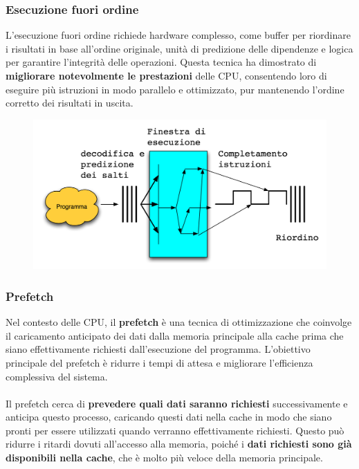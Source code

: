 \begin{frame}
	\frametitle{ Esecuzione fuori ordine}

		L'esecuzione fuori ordine richiede hardware complesso, come buffer per riordinare i risultati in base all'ordine originale, unità di predizione delle dipendenze e logica per garantire l'integrità delle operazioni. Questa tecnica ha dimostrato di \textbf{migliorare notevolmente le prestazioni} delle CPU, consentendo loro di eseguire più istruzioni in modo parallelo e ottimizzato, pur mantenendo l'ordine corretto dei risultati in uscita.%
		
		
		\begin{figure}[!htbp]
			\centering 
			\includegraphics[width=0.7\linewidth]{images/7_pipeline/superscalar_processor.png}
			\label{fig:pipeline_superscalar_processor}
		\end{figure}

\end{frame}


\begin{frame}
	\frametitle{ Prefetch}

		Nel contesto delle CPU, il \textbf{prefetch} è una tecnica di ottimizzazione che coinvolge il caricamento anticipato dei dati dalla memoria principale alla cache prima che siano effettivamente richiesti dall'esecuzione del programma. L'obiettivo principale del prefetch è ridurre i tempi di attesa e migliorare l'efficienza complessiva del sistema.\\~\\
		Il prefetch cerca di \textbf{prevedere quali dati saranno richiesti} successivamente e anticipa questo processo, caricando questi dati nella cache in modo che siano pronti per essere utilizzati quando verranno effettivamente richiesti. Questo può ridurre i ritardi dovuti all'accesso alla memoria, poiché i \textbf{dati richiesti sono già disponibili nella cache}, che è molto più veloce della memoria principale.

\end{frame}


